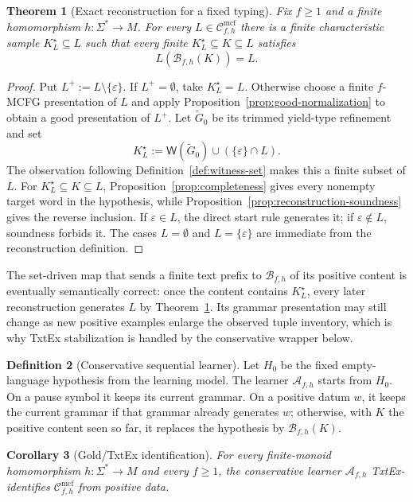 \documentclass[11pt]{article}
\numberwithin{equation}{section}
\theoremstyle{plain}
\newtheorem{theorem}{Theorem}[section]
\newtheorem{corollary}[theorem]{Corollary}
\theoremstyle{definition}
\newtheorem{definition}[theorem]{Definition}
\theoremstyle{remark}
\newcommand{\Wit}{\mathsf{W}}
\newcommand{\Cmcf}[2]{\mathcal{C}^{\mathrm{mcf}}_{#1,#2}}
\newcommand{\eps}{\varepsilon}
\begin{document}
\begin{theorem}[Exact reconstruction for a fixed typing]
\label{thm:exact-reconstruction}
Fix $f\ge1$ and a finite homomorphism $h:\Sigma^*\to M$.  For every
$L\in\Cmcf{f}{h}$ there is a finite characteristic sample
$K_L^{\star}\subseteq L$ such that every finite
$K_L^{\star}\subseteq K\subseteq L$ satisfies
\[
  L(\mathcal B_{f,h}(K))=L.
\]
\end{theorem}

\begin{proof}
Put $L^+:=L\setminus\{\eps\}$.  If $L^+=\emptyset$, take $K_L^\star=L$.
Otherwise choose a finite $f$-MCFG presentation of $L$ and apply
Proposition~\ref{prop:good-normalization} to obtain a good presentation of
$L^+$.  Let $\widetilde G_0$ be its trimmed yield-type refinement and set
\[
 K_L^\star:=\Wit(\widetilde G_0)\cup(\{\eps\}\cap L).
\]
The observation following Definition~\ref{def:witness-set} makes this a finite
subset of $L$.  For $K_L^\star\subseteq K\subseteq L$,
Proposition~\ref{prop:completeness} gives every nonempty target word in the
hypothesis, while Proposition~\ref{prop:reconstruction-soundness} gives the
reverse inclusion.  If $\eps\in L$, the direct start rule generates it; if
$\eps\notin L$, soundness forbids it.  The cases $L=\emptyset$ and
$L=\{\eps\}$ are immediate from the reconstruction definition.
\end{proof}

The set-driven map that sends a finite text prefix to
$\mathcal B_{f,h}$ of its positive content is eventually semantically correct:
once the content contains $K_L^\star$, every later reconstruction generates
$L$ by Theorem~\ref{thm:exact-reconstruction}.  Its grammar presentation may
still change as new positive examples enlarge the observed tuple inventory,
which is why TxtEx stabilization is handled by the conservative wrapper below.

\begin{definition}[Conservative sequential learner]
\label{def:conservative-learner}
Let $H_0$ be the fixed empty-language hypothesis from the learning model.  The
learner $\mathcal A_{f,h}$ starts from $H_0$.  On a pause symbol it keeps its
current grammar.  On a positive datum $w$, it keeps the current grammar if that
grammar already generates $w$; otherwise, with $K$ the positive content seen
so far, it replaces the hypothesis by $\mathcal B_{f,h}(K)$.
\end{definition}

\begin{corollary}[Gold/TxtEx identification]
\label{cor:gold-explanatory}
For every finite-monoid homomorphism $h:\Sigma^*\to M$ and every $f\ge1$,
the conservative learner $\mathcal A_{f,h}$ TxtEx-identifies
$\Cmcf{f}{h}$ from positive data.
\end{corollary}
\end{document}
